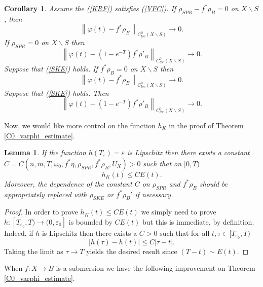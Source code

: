 \documentclass[12pt]{article}
\newtheorem{lemma}[theorem]{Lemma}
\newtheorem{corollary}[theorem]{Corollary}
\numberwithin{equation}{section}
\newcommand{\e}{\varepsilon}
\newcommand{\norm}[1]{\left\|#1\right\|}
\begin{document}
\begin{corollary}
Assume the (\ref{KRF}) satisfies (\ref{VFC}). If $\rho_{SPR} - f^*\rho_B = 0$ on $X \backslash S$, then 
\begin{equation*}
\norm{\varphi(t) - f^*\rho_B}_{C^0_{loc}(X\backslash S)} \to 0.
\end{equation*}
If $\rho_{SPR} = 0$ on $X \backslash S$ then 
\begin{equation*}
\norm{\varphi(t) - (1-e^{-T}) f^*\rho'_B}_{C^0_{loc}(X \backslash S)} \to 0.
\end{equation*}
Suppose that (\ref{SKE}) holds. If $f^* \rho_B = 0$ on $X \backslash S$ then 
\begin{equation*}
\norm{\varphi(t) - f^*\rho_B}_{C^0_{loc}(X \backslash S)} \to 0.
\end{equation*}
Suppose that (\ref{SKE}) holds. Then 
\begin{equation*}
\norm{\varphi(t) - (1-e^{-T})f^*\rho'_B}_{C^0_{loc}(X \backslash S)} \to 0.
\end{equation*}
\end{corollary}

\noindent Now, we would like more control on the function $h_K$ in the proof of Theorem \ref{C0_varphi_estimate}.

\begin{lemma}\label{lipschitz_lemma}
If the function $h(T_\e) = \e$ is Lipschitz then there exists a constant $C = C(n,m,T,\omega_0,f^*\eta,\rho_{SPR},f^*\rho_B,U_X) > 0$ such that on $[0,T)$
\begin{equation*}
h_K(t) \leq C E(t).
\end{equation*}
Moreover, the dependence of the constant $C$ on $\rho_{SPR}$ and $f^*\rho_B$ should be appropriately replaced with $\rho_{SKE}$ or $f^*\rho_B'$ if necessary.
\end{lemma}

\begin{proof}
In order to prove $h_K(t) \leq CE(t)$ we simply need to prove $h:[T_{\e_0}, T) \to (0,\e_0]$ is bounded by $CE(t)$ but this is immediate, by definition. Indeed, if $h$ is Lipschitz then there exists a $C > 0$ such that for all $t,\tau\in [T_{\e_0},T)$
\begin{equation*}
    |h(\tau)-h(t)| \leq C|\tau-t|.
\end{equation*}
Taking the limit as $\tau \to T$ yields the desired result since $(T-t) \sim E(t)$.
\end{proof}

\noindent When $f:X \to B$ is a submersion we have the following improvement on Theorem \ref{C0_varphi_estimate}.
\end{document}
